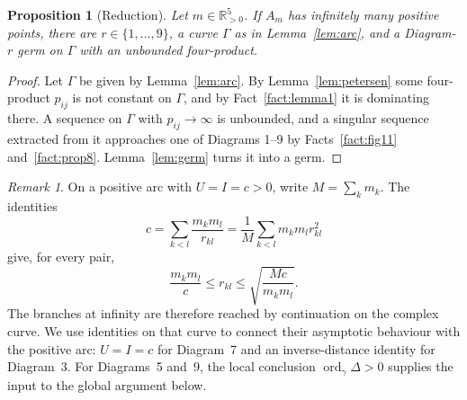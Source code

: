 \documentclass[Threeside,11pt]{article}
\newtheorem{proposition}[theorem]{Proposition}
\theoremstyle{definition}
\theoremstyle{remark}
\newtheorem{remark}[theorem]{Remark}
\numberwithin{equation}{section}
\theoremstyle{remark}
\newcommand{\Rp}{\mathbb{R}_{>0}}
\newcommand{\ord}{\operatorname{ord}}
\begin{document}
\begin{proposition}[Reduction]\label{prop:reduction}
Let $m\in\Rp^5$.  If $A_m$ has infinitely many positive points, there are $r\in\{1,\dots,9\}$, a
curve $\Gamma$ as in Lemma~\ref{lem:arc}, and a Diagram-$r$ germ on $\Gamma$ with an unbounded
four-product.
\end{proposition}

\begin{proof}
Let $\Gamma$ be given by Lemma~\ref{lem:arc}.  By Lemma~\ref{lem:petersen} some four-product
$p_{ij}$ is not constant on $\Gamma$, and by Fact~\ref{fact:lemma1} it is dominating there.  A
sequence on $\Gamma$ with $p_{ij}\to\infty$ is unbounded, and a singular sequence extracted from
it approaches one of Diagrams 1--9 by Facts~\ref{fact:fig11} and~\ref{fact:prop8}.
Lemma~\ref{lem:germ} turns it into a germ.
\end{proof}

\begin{remark}\label{rem:levels}
On a positive arc with $U=I=c>0$, write $M=\sum_km_k$.  The identities
\[
 c=\sum_{k<l}\frac{m_km_l}{r_{kl}}
   =\frac1M\sum_{k<l}m_km_lr_{kl}^2
\]
give, for every pair,
\[
 \frac{m_km_l}{c}\le r_{kl}\le\sqrt{\frac{Mc}{m_km_l}}.
\]
The branches at infinity are therefore reached by continuation on the complex curve.
We use identities on that curve to connect their asymptotic behaviour with the positive arc:
$U=I=c$ for Diagram~7 and an inverse-distance identity for Diagram~3.  For
Diagrams~5 and~9, the local conclusion $\ord_\gamma\Delta>0$ supplies the input to the
global argument below.
\end{remark}
\end{document}

